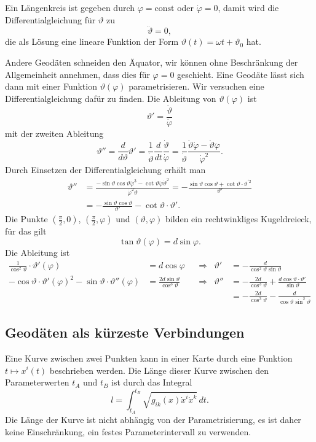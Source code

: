 Ein Längenkreis ist gegeben durch $\varphi=\text{const}$ oder
$\dot{\varphi}=0$, damit wird die Differentialgleichung für $\vartheta$
zu
\[
\ddot{\vartheta} = 0,
\]
die als Lösung eine lineare Funktion der Form
$\vartheta(t) = \omega t + \vartheta_0$ hat.

Andere Geodäten schneiden den Äquator, wir können ohne Beschränkung der
Allgemeinheit annehmen, dass dies für $\varphi=0$ geschieht.
Eine Geodäte lässt sich dann mit einer Funktion $\vartheta(\varphi)$
parametrisieren.
Wir versuchen eine Differentialgleichung dafür zu finden.
Die Ableitung von $\vartheta(\varphi)$ ist
\[
\vartheta'
=
\frac{\dot{\vartheta}}{\dot{\varphi}}
\]
mit der zweiten Ableitung
\[
\vartheta''
=
\frac{d}{d\vartheta} \vartheta'
=
\frac{1}{\dot{\vartheta}}\frac{d}{dt}\frac{\dot{\vartheta}}{\dot{\varphi}}
=
\frac{1}{\dot{\vartheta}}
\frac{\ddot{\vartheta}\dot{\varphi}-\dot{\vartheta}\ddot{\varphi}}{\dot{\varphi}^2}.
\]
Durch Einsetzen der Differentialgleichung erhält man
\begin{align*}
\vartheta''
&=
\frac{
-\sin\vartheta\cos\vartheta\dot{\varphi}^3
-
\cot\vartheta\dot{\varphi}\dot{\vartheta}^2
}{
\dot{\varphi}^2\dot{\vartheta}
}
=
-
\frac{
\sin\vartheta\cos\vartheta +\cot\vartheta\cdot \vartheta^{\prime 2}
}{
\vartheta'
}
\\
&=
-\frac{\sin\vartheta\cos\vartheta}{\vartheta'}
-\cot\vartheta\cdot\vartheta'.
\end{align*}
Die Punkte $(\frac{\pi}2,0)$, $(\frac{\pi}2,\varphi)$ und $(\vartheta,\varphi)$
bilden ein rechtwinkliges Kugeldreieck, für das gilt
\[
\tan\vartheta(\varphi)
=
d
\sin\varphi.
\]
Die Ableitung ist
\begin{align*}
\frac{1}{\cos^2\vartheta}
\cdot \vartheta'(\varphi)
&=
d\cos\varphi
&&\Rightarrow&
\vartheta'
&=
-\frac{d}{\cos^2\vartheta\sin\vartheta}
\\
-\cos\vartheta \cdot\vartheta'(\varphi)^2
-\sin\vartheta\cdot\vartheta''(\varphi)
&=
\frac{2d\sin \vartheta}{\cos^3\vartheta}
&&\Rightarrow&
\vartheta''
&=
-\frac{2d}{\cos^3\vartheta}+\frac{d\cos\vartheta\cdot \vartheta'}{\sin\vartheta}
\\
&
&&&
&=
-\frac{2d}{\cos^3\vartheta}-\frac{d}{\cos\vartheta\sin^2\vartheta}
\end{align*}


%
%
\subsection{Geodäten als kürzeste Verbindungen
\label{buch:zusammenhang:geodaeten:subsection:kuerzeste}}
Eine Kurve zwischen zwei Punkten kann in einer Karte durch eine Funktion
\(
t\mapsto x^i(t)
\)
beschrieben werden.
Die Länge dieser Kurve zwischen den Parameterwerten $t_A$ und $t_B$
ist durch das Integral
\begin{equation}
l
=
\int_{t_A}^{t_B}
\sqrt{g_{ik}(x) \dot{x}^i \dot{x}^k }
\,dt.
\label{buch:zusammenhang:geodaeten:eqn:funktional}
\end{equation}
Die Länge der Kurve ist nicht abhängig von der Parametrisierung, es ist
daher keine Einschränkung, ein festes Parameterintervall zu verwenden.

